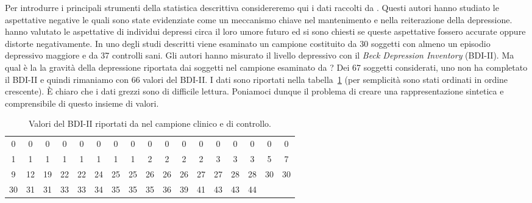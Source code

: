 Per introdurre i principali strumenti della statistica descrittiva considereremo qui i dati raccolti da \citet{zetsche_future_2019}. 
Questi autori hanno studiato le aspettative negative le quali sono state evidenziate come un meccanismo chiave nel mantenimento e nella reiterazione della depressione. 
\citet{zetsche_future_2019} hanno valutato le aspettative di individui depressi circa il loro umore futuro ed si sono chiesti se queste aspettative fossero accurate oppure distorte negativamente. 
In uno degli studi descritti viene esaminato un campione costituito da 30 soggetti con almeno un episodio depressivo maggiore e da 37 controlli sani. 
Gli autori hanno misurato il livello depressivo con il \emph{Beck Depression Inventory} (BDI-II).
Ma qual è la la gravità della depressione riportata dai soggetti nel campione esaminato da \citet{zetsche_future_2019}?
Dei 67 soggetti considerati, uno non ha completato il BDI-II e quindi rimaniamo con 66 valori del BDI-II.
I dati sono riportati nella tabella~\ref{tab:Zetsche2020} (per semplicità sono stati ordinati in ordine crescente). 
È chiaro che i dati grezzi sono di difficile lettura. 
Poniamoci dunque il problema di creare una rappresentazione sintetica e comprensibile di questo insieme di valori.

\begin{table}[h!]
\scriptsize
\caption{Valori del BDI-II riportati da \citet{zetsche_future_2019} nel campione clinico e di controllo.}
\label{tab:Zetsche2020}
\centering
\begin{tabular}{ccccccccccccccccc}
 \toprule
0 & 0 & 0 & 0 & 0 & 0 & 0 & 0 & 0 & 0 & 0 & 0 & 0 & 0 & 0 & 0 & 0 \\ 
1 & 1 & 1 & 1 & 1 & 1 & 1 & 1 & 2 & 2 & 2 & 2 & 3 & 3 & 3 & 5 & 7 \\
9 & 12 & 19 & 22 & 22 & 24 & 25 & 25 & 26 & 26 & 26 & 27 & 27 & 28 & 28 & 30 & 30 \\ 
30 & 31 & 31 & 33 & 33 & 34 & 35 & 35 & 35 & 36 & 39 & 41 & 43 & 43 & 44 & & \\
 \bottomrule
\end{tabular}
\end{table}

